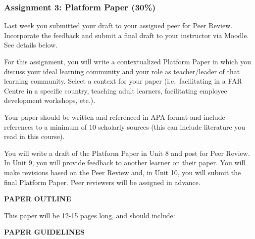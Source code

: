 \documentclass[
]{book}
\providecommand{\tightlist}{%
  \setlength{\itemsep}{0pt}\setlength{\parskip}{0pt}}
\begin{document}
\begin{assessment}
\hypertarget{assignment-3-platform-paper-30}{%
\subsubsection{Assignment 3: Platform Paper
(30\%)}\label{assignment-3-platform-paper-30}}

Last week you submitted your draft to your assigned peer for Peer
Review. Incorporate the feedback and submit a final draft to your
instructor via Moodle. See details below.

For this assignment, you will write a contextualized Platform Paper in
which you discuss your ideal learning community and your role as
teacher/leader of that learning community. Select a context for your
paper (i.e.~facilitating in a FAR Centre in a specific country, teaching
adult learners, facilitating employee development workshops, etc.).

Your paper should be written and referenced in APA format and include
references to a minimum of 10 scholarly sources (this can include
literature you read in this course).

You will write a draft of the Platform Paper in Unit 8 and post for Peer
Review. In Unit 9, you will provide feedback to another learner on their
paper. You will make revisions based on the Peer Review and, in Unit 10,
you will submit the final Platform Paper. Peer reviewers will be
assigned in advance.

\textbf{PAPER OUTLINE}

This paper will be 12-15 pages long, and should include:


\textbf{PAPER GUIDELINES}


\end{assessment}
\end{document}
